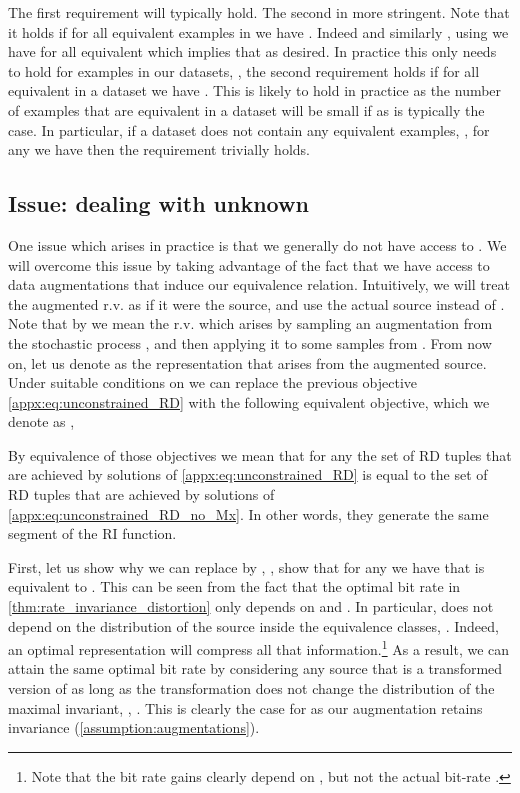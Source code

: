 \documentclass[final]{article}
\begin{document}
The first requirement will typically hold. 
The second in more stringent.
Note that it holds if for all equivalent examples  in  we have .
Indeed  and similarly , using  we have  for all equivalent  which implies that  as desired.
In practice this only needs to hold for examples in our datasets, \ie, the second requirement holds if for all equivalent  in a dataset we have .
This is likely to hold in practice as the number of examples that are equivalent in a dataset will be small if  as is typically the case.
In particular, if a dataset does not contain any equivalent examples, \ie, for any  we have  then the requirement trivially holds.





\subsection{Issue: dealing with unknown \texorpdfstring{}{M(X)}}
\label{appx:unkown_M}

One issue which arises in practice is that we generally do not have access to .
We will overcome this issue by taking advantage of the fact that we have access to data augmentations   that induce our equivalence relation.
Intuitively, we will treat the augmented r.v.  as if it were the source, and use the actual source  instead of .
Note that by  we mean the r.v. which arises by sampling an augmentation  from the stochastic process , and then applying it to some samples  from .
From now on, let us denote as  the representation that arises from the augmented source.
Under suitable conditions on  we can replace the previous objective \cref{appx:eq:unconstrained_RD} with the following equivalent objective, which we denote as , 

By equivalence of those objectives we mean that for any  the set of RD tuples  that are achieved by solutions of \cref{appx:eq:unconstrained_RD}  is equal to the set of RD tuples  that are achieved by solutions of \cref{appx:eq:unconstrained_RD_no_Mx}.
In other words, they generate the same segment of the RI function.

First, let us show why we can replace  by , \ie, show that for any   we have that  is equivalent to .
This can be seen from the fact that the optimal bit rate in \cref{thm:rate_invariance_distortion} only depends on  and .
In particular,  does not depend on the distribution of the source inside the equivalence classes, .
Indeed, an optimal representation will compress all that information.\footnote{Note that the bit rate gains  clearly depend on , but not the actual bit-rate .}
As a result, we can attain the same optimal bit rate by considering any source  that is a transformed version of  as long as the transformation does not change the distribution of the maximal invariant, \ie, .
This is clearly the case for  as our augmentation retains invariance (\cref{assumption:augmentations}).
\end{document}
